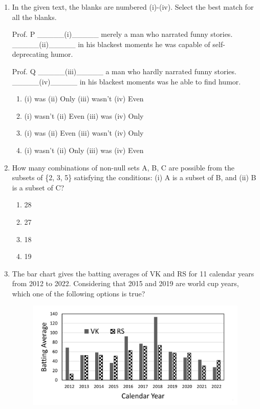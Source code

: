 \documentclass[journal,11pt,onecolumn]{IEEEtran}
\begin{document}
\begin{enumerate}[resume]

    \item In the given text, the blanks are numbered (i)-(iv). Select the best match for all the blanks.

          Prof. P \_\_\_\_\_(i)\_\_\_\_\_ merely a man who narrated funny stories. \_\_\_\_\_(ii)\_\_\_\_\_ in his blackest moments he was capable of self-deprecating humor.

          Prof. Q \_\_\_\_\_(iii)\_\_\_\_\_ a man who hardly narrated funny stories. \_\_\_\_\_(iv)\_\_\_\_\_ in his blackest moments was he able to find humor.

          \begin{enumerate}
              \item (i) was (ii) Only (iii) wasn't (iv) Even
              \item (i) wasn't (ii) Even (iii) was (iv) Only
              \item (i) was (ii) Even (iii) wasn't (iv) Only
              \item (i) wasn't (ii) Only (iii) was (iv) Even
          \end{enumerate}

    \item How many combinations of non-null sets A, B, C are possible from the subsets of \{2, 3, 5\} satisfying the conditions: (i) A is a subset of B, and (ii) B is a subset of C?

          \begin{enumerate}
              \item 28
              \item 27
              \item 18
              \item 19
          \end{enumerate}

    \item The bar chart gives the batting averages of VK and RS for 11 calendar years from 2012 to 2022. Considering that 2015 and 2019 are world cup years, which one of the following options is true?

          \begin{figure}[H]
              \centering
              \includegraphics[scale=0.2]{q8}
              \caption{}
              \label{fig:q8}
          \end{figure}


\end{enumerate}
\end{document}
